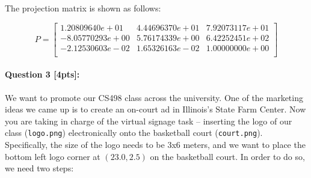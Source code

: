 \documentclass[11pt]{article}
\begin{document}
The projection matrix is shown as follows:

\[ P = 
\left[
\begin{array}{ccc}
1.20809640e+01 & 4.44696370e+01 & 7.92073117e+01 \\
-8.05770293e+00 & 5.76174339e+00 & 6.42252451e+02 \\
-2.12530603e-02 & 1.65326163e-02 & 1.00000000e+00 \\
\end{array}
\right]
\]

\paragraph{Question 3 [4pts]:}

We want to promote our CS498 class across the university. One of the marketing ideas we came up is to create an on-court ad in Illinois's State Farm Center. Now you are taking in charge of the virtual signage task --  inserting the logo of our class (\texttt{logo.png}) electronically onto the basketball court (\texttt{court.png}). Specifically, the size of the logo needs to be 3x6 meters, and we want to place the bottom left logo corner at $(23.0, 2.5)$ on the basketball court. In order to do so, we need two steps: 
\end{document}
